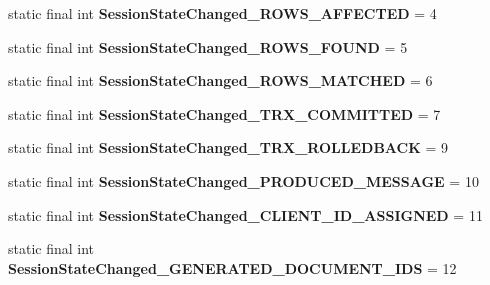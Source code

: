 \begin{DoxyCompactItemize}
static final int {\bfseries Session\+State\+Changed\+\_\+\+R\+O\+W\+S\+\_\+\+A\+F\+F\+E\+C\+T\+ED} = 4
\item 
\mbox{\label{classcom_1_1mysql_1_1cj_1_1protocol_1_1x_1_1_notice_a5714d3753b1b8a63fb51615a5ab4b1cd}} 
static final int {\bfseries Session\+State\+Changed\+\_\+\+R\+O\+W\+S\+\_\+\+F\+O\+U\+ND} = 5
\item 
\mbox{\label{classcom_1_1mysql_1_1cj_1_1protocol_1_1x_1_1_notice_a4a7381a136a4918be60c07e75dd4e3ef}} 
static final int {\bfseries Session\+State\+Changed\+\_\+\+R\+O\+W\+S\+\_\+\+M\+A\+T\+C\+H\+ED} = 6
\item 
\mbox{\label{classcom_1_1mysql_1_1cj_1_1protocol_1_1x_1_1_notice_ac5e672d4dab6b2a0e0feb7e793b05846}} 
static final int {\bfseries Session\+State\+Changed\+\_\+\+T\+R\+X\+\_\+\+C\+O\+M\+M\+I\+T\+T\+ED} = 7
\item 
\mbox{\label{classcom_1_1mysql_1_1cj_1_1protocol_1_1x_1_1_notice_a04d7d0e0746f3a7e710ef42ec6dc8701}} 
static final int {\bfseries Session\+State\+Changed\+\_\+\+T\+R\+X\+\_\+\+R\+O\+L\+L\+E\+D\+B\+A\+CK} = 9
\item 
\mbox{\label{classcom_1_1mysql_1_1cj_1_1protocol_1_1x_1_1_notice_a3c15e1f4d0d1803a27f1e77f80837c66}} 
static final int {\bfseries Session\+State\+Changed\+\_\+\+P\+R\+O\+D\+U\+C\+E\+D\+\_\+\+M\+E\+S\+S\+A\+GE} = 10
\item 
\mbox{\label{classcom_1_1mysql_1_1cj_1_1protocol_1_1x_1_1_notice_a09fa5be11cb450729df25e5cc2d9636e}} 
static final int {\bfseries Session\+State\+Changed\+\_\+\+C\+L\+I\+E\+N\+T\+\_\+\+I\+D\+\_\+\+A\+S\+S\+I\+G\+N\+ED} = 11
\item 
\mbox{\label{classcom_1_1mysql_1_1cj_1_1protocol_1_1x_1_1_notice_a1ec8eb7c0785d9b153926c2287a24549}} 
static final int {\bfseries Session\+State\+Changed\+\_\+\+G\+E\+N\+E\+R\+A\+T\+E\+D\+\_\+\+D\+O\+C\+U\+M\+E\+N\+T\+\_\+\+I\+DS} = 12
\end{DoxyCompactItemize}


